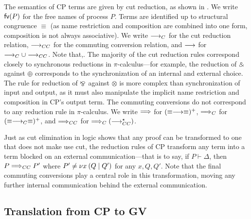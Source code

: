 \documentclass[oribibl,orivec,envcountsame]{llncs}
\begin{document}
The semantics of CP terms are given by cut reduction, as shown in .  We write
$\mathsf{fv}(P)$ for the free names of process $P$.  Terms are identified up to structural congruence
$\equiv$ (as name restriction and composition are combined into one form, composition is not always
associative). We write $\longrightarrow_C$ for the cut reduction relation, $\longrightarrow_{CC}$ for the commuting conversion
relation, and $\longrightarrow$ for $\longrightarrow_C \cup \longrightarrow_{CC}$. Note that,. The majority of the cut reduction rules
correspond closely to synchronous reductions in $\pi$-calculus---for example, the reduction of
$\mathbin\binampersand$ against $\oplus$ corresponds to the synchronization of an internal and external choice.  The
rule for reduction of $\mathbin\bindnasrepma$ against $\otimes$ is more complex than synchronization of input and
output, as it must also manipulate the implicit name restriction and composition in CP's output
term. The commuting conversions do not correspond to any reduction rule in $\pi$-calculus. We write
$\Longrightarrow$ for $(\equiv\longrightarrow\equiv)^+$, $\Longrightarrow_C$ for $(\equiv\longrightarrow_C\equiv)^+$, and $\Longrightarrow_{CC}$ for
$\Longrightarrow_C(\longrightarrow_{CC}^\star)$.

Just as cut elimination in logic shows that any proof can be transformed to one that does not make
use cut, the reduction rules of CP transform any term into a term blocked on an external
communication---that is to say, if $P \vdash \Delta$, then $P \Longrightarrow_{CC} P'$ where $P' \not= \nu x \: (Q \mid Q')$ for any $x,Q,Q'$. Note that the final commuting conversions play a central role in this
transformation, moving any further internal communication behind the external communication.

\subsection{Translation from CP to GV}\label{sec:togv}
\end{document}
